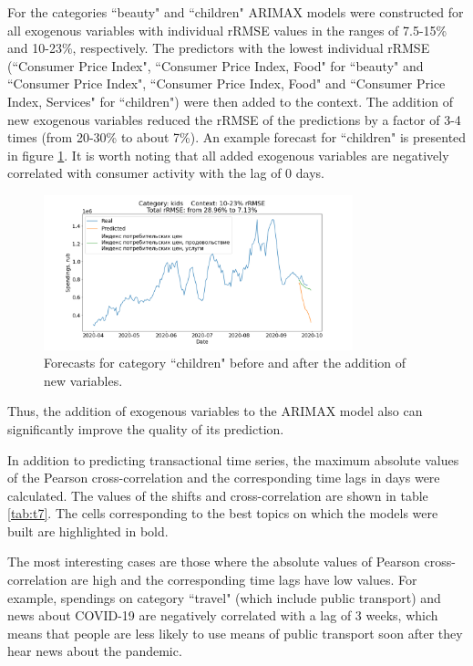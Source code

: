 \documentclass[13pt, a4paper]{article}
\begin{document}
For the categories ``beauty" and ``children" ARIMAX models were constructed for all exogenous variables with individual rRMSE values in the ranges of 7.5-15\% and 10-23\%, respectively. The predictors with the lowest individual rRMSE (``Consumer Price Index", ``Consumer Price Index, Food" for ``beauty" and ``Consumer Price Index", ``Consumer Price Index, Food" and ``Consumer Price Index, Services" for ``children") were then added to the context. The addition of new exogenous variables reduced the rRMSE of the predictions by a factor of 3-4 times (from 20-30\% to about 7\%). An example forecast for ``children" is presented in figure \ref{fig:gr13}. It is worth noting that all added exogenous variables are negatively correlated with consumer activity with the lag of 0 days.
\begin{figure}[h!]\vspace*{4pt}
\centerline{\includegraphics[width=0.8\textwidth]{./visuals/gr13.png}}
\caption{Forecasts for category ``children" before and after the addition of new variables.}
\label{fig:gr13}
\end{figure}

Thus, the addition of exogenous variables to the ARIMAX model also can significantly improve the quality of its prediction. 

In addition to predicting transactional time series, the maximum absolute values of the Pearson cross-correlation and the corresponding time lags in days were calculated. The values of the shifts and cross-correlation are shown in table \ref{tab:t7}. The cells corresponding to the best topics on which the models were built are highlighted in bold.

The most interesting cases are those where the absolute values of Pearson cross-correlation are high and the corresponding time lags have low values. For example, spendings on category ``travel" (which include public transport) and news about COVID-19 are negatively correlated with a lag of 3 weeks, which means that people are less likely to use means of public transport soon after they hear news about the pandemic.
\end{document}
